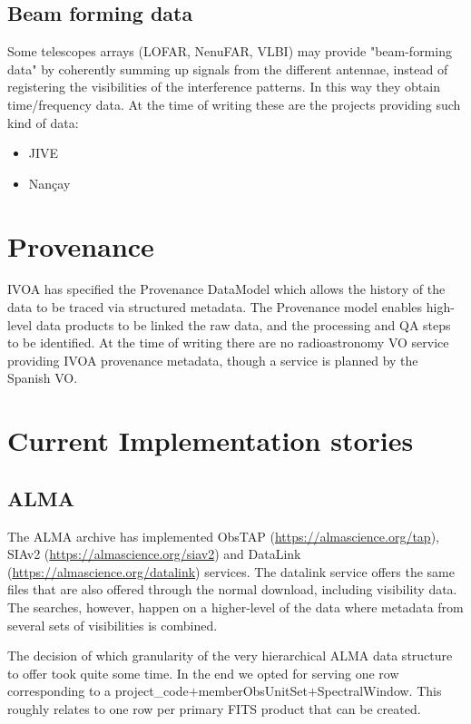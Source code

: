 \documentclass[11pt,a4paper]{ivoa}
\begin{document}
\subsection{Beam forming data}
Some telescopes arrays (LOFAR, NenuFAR, VLBI) may provide "beam-forming data" by coherently summing up signals from the different antennae, instead of registering the visibilities of the interference patterns. In this way they obtain time/frequency data. At the time of writing these are the projects providing such kind of data:
\begin{itemize}
\item JIVE
\item Nan\c cay
\end{itemize}
\section{Provenance}

IVOA has specified the Provenance DataModel \citep{2020ivoa.spec.0411S} which allows the history of the data to be traced via structured metadata. The Provenance model enables high-level data products to be linked the raw data, and the processing and QA steps to be identified. At the time of writing there are no radioastronomy VO service providing IVOA provenance metadata, though a service is planned by the Spanish VO.   

%



\appendix
\section{ Current Implementation stories}

\subsection{ALMA}
\label{sec:ALMA}
The ALMA archive has implemented ObsTAP (\url{https://almascience.org/tap}), SIAv2 (\url{https://almascience.org/siav2}) and DataLink (\url{https://almascience.org/datalink}) services.
The datalink service offers the same files that are also offered through the normal download, including visibility data. The searches, however,
happen on a higher-level of the data where metadata from several sets of visibilities is combined.

The decision of which granularity of the very hierarchical ALMA data
structure to offer took quite some time. In the end we opted for serving
one row corresponding to a project\_code$+$memberObsUnitSet$+$SpectralWindow. This roughly relates to one row per primary FITS product that can be created.
\end{document}

